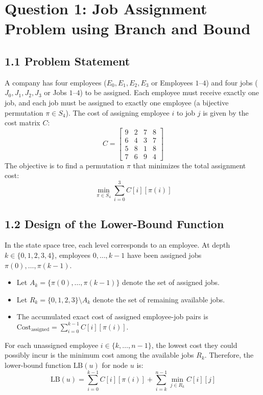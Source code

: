 \documentclass[12pt]{article}
\begin{document}
\vspace{0.3cm}

\section*{Question 1: Job Assignment Problem using Branch and Bound}

\subsection*{1.1 Problem Statement}
A company has four employees ($E_0, E_1, E_2, E_3$ or Employees $1$--$4$) and four jobs ($J_0, J_1, J_2, J_3$ or Jobs $1$--$4$) to be assigned. Each employee must receive exactly one job, and each job must be assigned to exactly one employee (a bijective permutation $\pi \in S_4$). The cost of assigning employee $i$ to job $j$ is given by the cost matrix $C$:
\[
C = \begin{bmatrix}
9 & 2 & 7 & 8 \\
6 & 4 & 3 & 7 \\
5 & 8 & 1 & 8 \\
7 & 6 & 9 & 4
\end{bmatrix}
\]
The objective is to find a permutation $\pi$ that minimizes the total assignment cost:
\[
\min_{\pi \in S_4} \sum_{i=0}^{3} C[i][\pi(i)]
\]

\subsection*{1.2 Design of the Lower-Bound Function}
In the state space tree, each level corresponds to an employee. At depth $k \in \{0, 1, 2, 3, 4\}$, employees $0, \dots, k-1$ have been assigned jobs $\pi(0), \dots, \pi(k-1)$.
\begin{itemize}
    \item Let $A_k = \{\pi(0), \dots, \pi(k-1)\}$ denote the set of assigned jobs.
    \item Let $R_k = \{0, 1, 2, 3\} \setminus A_k$ denote the set of remaining available jobs.
    \item The accumulated exact cost of assigned employee-job pairs is $\text{Cost}_{\text{assigned}} = \sum_{i=0}^{k-1} C[i][\pi(i)]$.
\end{itemize}
For each unassigned employee $i \in \{k, \dots, n-1\}$, the lowest cost they could possibly incur is the minimum cost among the available jobs $R_k$. Therefore, the lower-bound function $\text{LB}(u)$ for node $u$ is:
\begin{equation}
\text{LB}(u) = \sum_{i=0}^{k-1} C[i][\pi(i)] + \sum_{i=k}^{n-1} \min_{j \in R_k} C[i][j]
\end{equation}
\end{document}
